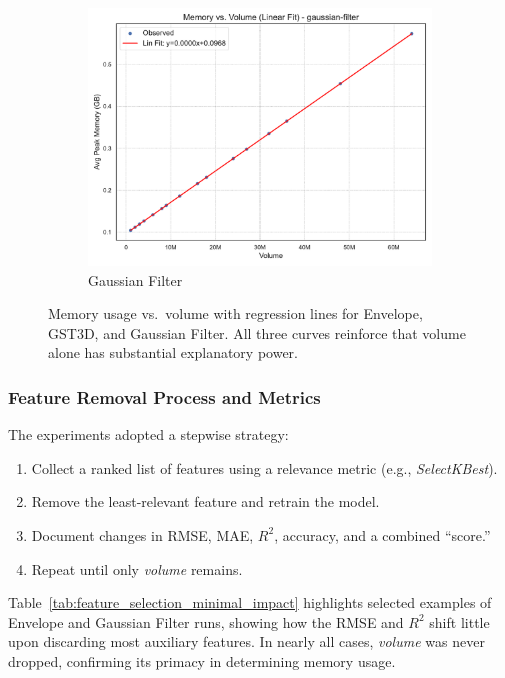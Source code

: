 \begin{figure}[htbp]
\begin{subfigure}[t]{0.32\textwidth}
        \includegraphics[width=\textwidth]{assets/images/05/memory_vs_volume_regression_gaussian-filter}
        \caption{Gaussian Filter}
    \end{subfigure}
    \caption{Memory usage vs.\ volume with regression lines for Envelope, \ac{GST3D}, and Gaussian Filter.
    All three curves reinforce that volume alone has substantial explanatory power.}
    \label{fig:memory_vs_volume_regression_subplots}
\end{figure}

\subsubsection{Feature Removal Process and Metrics}
\label{subsec:feature-removal-methods-and-metrics}

The experiments adopted a stepwise strategy:
\begin{enumerate}
    \item Collect a ranked list of features using a relevance metric (e.g., \emph{SelectKBest}). 
    \item Remove the least-relevant feature and retrain the model.
    \item Document changes in \ac{RMSE}, \ac{MAE}, $R^2$, accuracy, and a combined “score.”
    \item Repeat until only \emph{volume} remains.
\end{enumerate}
Table~\ref{tab:feature_selection_minimal_impact} highlights selected examples of Envelope and Gaussian Filter runs, showing how the \ac{RMSE} and $R^2$ shift little upon discarding most auxiliary features.
In nearly all cases, \emph{volume} was never dropped, confirming its primacy in determining memory usage.

